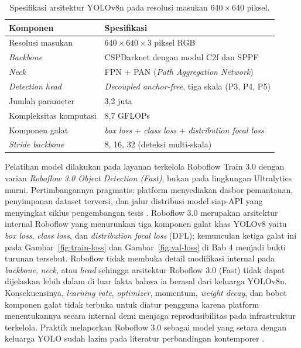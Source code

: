 \begin{table}[H]
\centering
\caption{Spesifikasi arsitektur YOLOv8n pada resolusi masukan $640 \times 640$ piksel.}
\label{tab:arsitektur-yolov8n}
\begin{tabular}{ll}
\hline
\textbf{Komponen} & \textbf{Spesifikasi} \\
\hline
Resolusi masukan       & $640 \times 640 \times 3$ piksel RGB \\
\textit{Backbone}      & CSPDarknet dengan modul C2f dan SPPF \\
\textit{Neck}          & FPN + PAN (\textit{Path Aggregation Network}) \\
\textit{Detection head} & \textit{Decoupled anchor-free}, tiga skala (P3, P4, P5) \\
Jumlah parameter       & 3,2 juta \\
Kompleksitas komputasi & 8,7 GFLOPs \\
Komponen galat         & \textit{box loss} + \textit{class loss} + \textit{distribution focal loss} \\
\textit{Stride backbone} & 8, 16, 32 (deteksi multi-skala) \\
\hline
\end{tabular}
\end{table}

Pelatihan model dilakukan pada layanan terkelola Roboflow Train 3.0 dengan varian \textit{Roboflow 3.0 Object Detection (Fast)}, bukan pada lingkungan Ultralytics murni. Pertimbangannya pragmatis: platform menyediakan dasbor pemantauan, penyimpanan dataset terversi, dan jalur distribusi model siap-API yang menyingkat siklus pengembangan tesis \cite{roboflowdocs2025,roboflowblog2023}. Roboflow 3.0 merupakan arsitektur internal Roboflow yang menurunkan tiga komponen galat khas YOLOv8 yaitu \textit{box loss}, \textit{class loss}, dan \textit{distribution focal loss} (DFL); kemunculan ketiga galat ini pada Gambar~\ref{fig:train-loss} dan Gambar~\ref{fig:val-loss} di Bab 4 menjadi bukti turunan tersebut. Roboflow tidak membuka detail modifikasi internal pada \textit{backbone}, \textit{neck}, atau \textit{head} sehingga arsitektur Roboflow 3.0 (Fast) tidak dapat dijelaskan lebih dalam di luar fakta bahwa ia berasal dari keluarga YOLOv8n. Konsekuensinya, \textit{learning rate}, \textit{optimizer}, momentum, \textit{weight decay}, dan bobot komponen galat tidak terbuka untuk diatur pengguna karena platform menentukannya secara internal demi menjaga reprodusibilitas pada infrastruktur terkelola. Praktik melaporkan Roboflow 3.0 sebagai model yang setara dengan keluarga YOLO sudah lazim pada literatur perbandingan kontemporer \cite{solano2025roboflow}.

